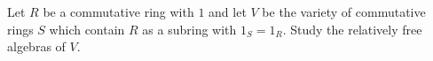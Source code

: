 Let $R$ be a commutative ring with $1$ and let $V$ be the variety of commutative rings $S$ which contain $R$ as a subring with $1_S = 1_R$. Study the relatively free algebras of $V$.
